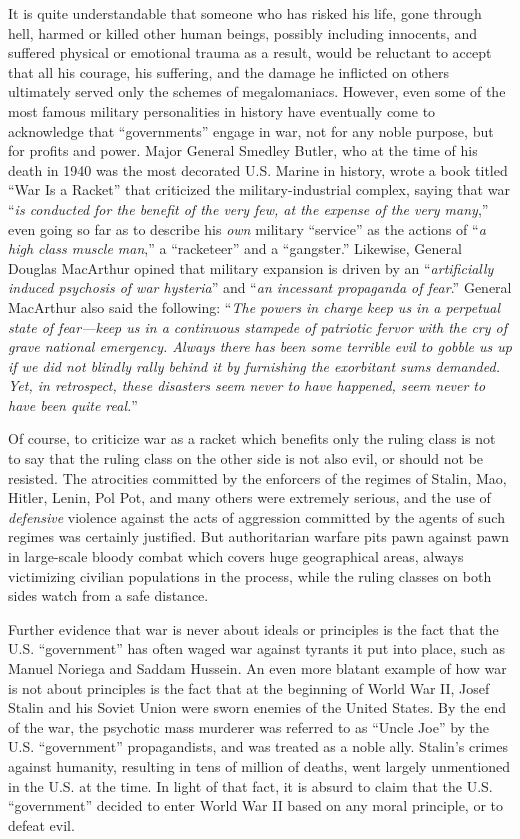 \documentclass{book}
\begin{document}
It is quite understandable that someone who has risked his life, gone through hell, harmed or killed other human beings, possibly including innocents, and suffered physical or emotional trauma as a result, would be reluctant to accept that all his courage, his suffering, and the damage he inflicted on others ultimately served only the schemes of megalomaniacs. However, even some of the most famous military personalities in history have eventually come to acknowledge that \enquote{governments} engage in war, not for any noble purpose, but for profits and power. Major General Smedley Butler, who at the time of his death in 1940 was the most decorated U.S. Marine in history, wrote a book titled \enquote{War Is a Racket} that criticized the military-industrial complex, saying that war \enquote{\emph{is conducted for the benefit of the very few, at the expense of the very many},} even going so far as to describe his \emph{own} military \enquote{service} as the actions of \enquote{\emph{a high class muscle man},} a \enquote{racketeer} and a \enquote{gangster.} Likewise, General Douglas MacArthur opined that military expansion is driven by an \enquote{\emph{artificially induced psychosis of war hysteria}} and \enquote{\emph{an incessant propaganda of fear}.} General MacArthur also said the following: \enquote{\emph{The powers in charge keep us in a perpetual state of fear---keep us in a continuous stampede of patriotic fervor with the cry of grave national emergency. Always there has been some terrible evil to gobble us up if we did not blindly rally behind it by furnishing the exorbitant sums demanded. Yet, in retrospect, these disasters seem never to have happened, seem never to have been quite real.}}

Of course, to criticize war as a racket which benefits only the ruling class is not to say that the ruling class on the other side is not also evil, or should not be resisted. The atrocities committed by the enforcers of the regimes of Stalin, Mao, Hitler, Lenin, Pol Pot, and many others were extremely serious, and the use of \emph{defensive} violence against the acts of aggression committed by the agents of such regimes was certainly justified. But authoritarian warfare pits pawn against pawn in large-scale bloody combat which covers huge geographical areas, always victimizing civilian populations in the process, while the ruling classes on both sides watch from a safe distance.

Further evidence that war is never about ideals or principles is the fact that the U.S. \enquote{government} has often waged war against tyrants it put into place, such as Manuel Noriega and Saddam Hussein. An even more blatant example of how war is not about principles is the fact that at the beginning of World War II, Josef Stalin and his Soviet Union were sworn enemies of the United States. By the end of the war, the psychotic mass murderer was referred to as \enquote{Uncle Joe} by the U.S. \enquote{government} propagandists, and was treated as a noble ally. Stalin's crimes against humanity, resulting in tens of million of deaths, went largely unmentioned in the U.S. at the time. In light of that fact, it is absurd to claim that the U.S. \enquote{government} decided to enter World War II based on any moral principle, or to defeat evil.
\end{document}
